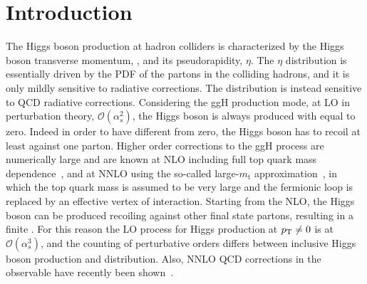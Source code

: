 \section{Introduction}
\label{sec:Introduction}


The Higgs boson production at hadron colliders is characterized by the Higgs boson transverse momentum, \pth, and its pseudorapidity, $\eta$. The $\eta$ distribution is essentially driven by the PDF of the partons in the colliding hadrons, and it is only mildly sensitive to radiative corrections. The \pth distribution is instead sensitive to QCD radiative corrections. 
Considering the ggH production mode, at LO in perturbation theory, $\mathcal{O}(\alpha_s^2)$, the Higgs boson is always produced with \pth equal to zero. Indeed in order to have \pt different from zero, the Higgs boson has to recoil at least against one parton. Higher order corrections to the ggH process are numerically large and are known at NLO including full top quark mass dependence~\cite{Spira:1995rr,Harlander:2005rq}, and at NNLO using the so-called large-$m_\mathrm{t}$ approximation~\cite{Ravindran:2003um,Catani:2007vq,Anastasiou:2015ema}, in which the top quark mass is assumed to be very large and the fermionic loop is replaced by an effective vertex of interaction. Starting from the NLO, the Higgs boson can be produced recoiling against other final state partons, resulting in a finite \pth. For this reason the LO process for Higgs production at $p_\mathrm{T} \neq 0$ is at $\mathcal{O}(\alpha_s^3)$, and the counting of perturbative orders differs between inclusive Higgs boson production and \pth distribution. Also, NNLO QCD corrections in the \pth observable have recently been shown~\cite{Chen:2016zka}.

